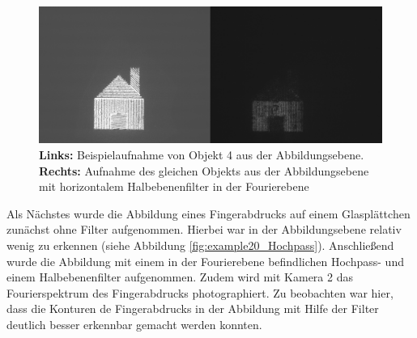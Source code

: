 \begin{figure}
	\centering
	\includegraphics[width=0.7\linewidth]{images/example19.png}
	\caption{
		\textbf{Links:} Beispielaufnahme von Objekt 4 aus der Abbildungsebene. \textbf{Rechts:} Aufnahme des gleichen Objekts aus der Abbildungsebene mit horizontalem Halbebenenfilter in der Fourierebene
	}
	\label{fig:example19}
\end{figure}

Als Nächstes wurde die Abbildung eines Fingerabdrucks auf einem Glasplättchen zunächst ohne Filter aufgenommen. Hierbei war in der Abbildungsebene relativ wenig zu erkennen (siehe Abbildung \ref{fig:example20_Hochpass}). Anschließend wurde die Abbildung mit einem in der Fourierebene befindlichen Hochpass- und einem Halbebenenfilter aufgenommen. Zudem wird mit Kamera 2 das Fourierspektrum des Fingerabdrucks photographiert. Zu beobachten war hier, dass die Konturen de Fingerabdrucks in der Abbildung mit Hilfe der Filter deutlich besser erkennbar gemacht werden konnten.\\

